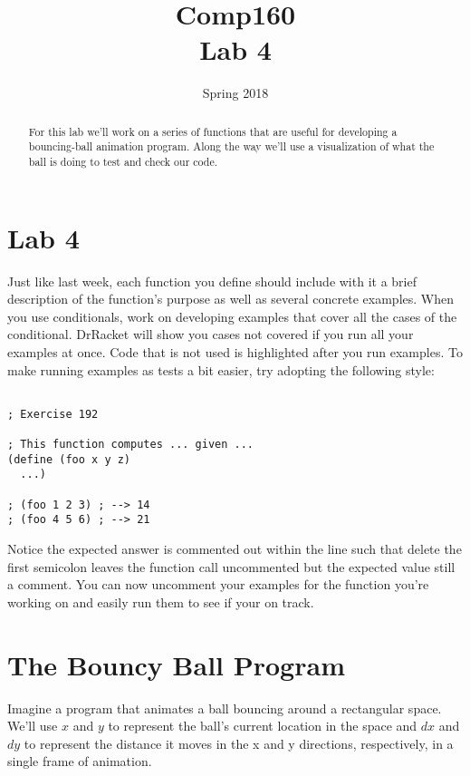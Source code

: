 \documentclass[nobib]{tufte-handout}
\title{Comp160 \\ Lab 4 }
\author{}
\date{ Spring 2018 }
\begin{document}
\maketitle

\begin{abstract}
For this lab we'll work on a series of functions that are useful for developing a bouncing-ball animation program.  Along the way we'll use a visualization of what the ball is doing to test and check our code.
\end{abstract}

\section*{Lab 4}

Just like last week, each function you define should include with it a brief description of the function's purpose as well as several concrete examples. When you use conditionals, work on developing examples that cover all the cases of the conditional. DrRacket will show you cases not covered if you run all your examples at once. Code that is not used is highlighted after you run examples. To make running examples as tests a bit easier, try adopting the following style:

\begin{lstlisting}

; Exercise 192

; This function computes ... given ...
(define (foo x y z)
  ...)

; (foo 1 2 3) ; --> 14
; (foo 4 5 6) ; --> 21
\end{lstlisting}

Notice the expected answer is commented out within the line such that delete the first semicolon leaves the function call uncommented but the expected value still a comment. You can now uncomment your examples for the function you're working on and easily run them to see if your on track.

\section*{The Bouncy Ball Program}

Imagine a program that animates a ball bouncing around a rectangular space.  We'll use \(x\) and \(y\) to represent the ball's current location in the space and \(dx\) and \(dy\) to represent the distance it moves in the x and y directions, respectively, in a single frame of animation.
\end{document}
